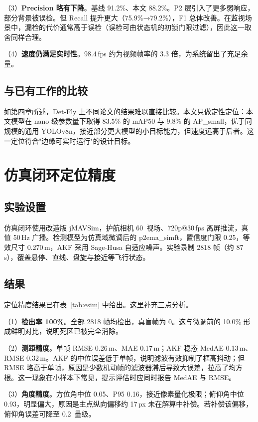 （3）\textbf{Precision 略有下降}。基线 91.2\%、本文 88.2\%。P2 层引入了更多弱响应，部分背景被误检。但 Recall 提升更大（75.9\%→79.2\%），F1 总体改善。在监视场景中，漏检的代价通常高于误检（误检可由状态机的初锁门限过滤），因此这一取舍同样合理。

（4）\textbf{速度仍满足实时性}。98.4\,fps 约为视频帧率的 3.3 倍，为系统留出了充足余量。

\subsection{与已有工作的比较}

如第四章所述，Det-Fly 上不同论文的结果难以直接比较。本文只做定性定位：本文模型在 nano 级参数量下取得 83.5\% 的 mAP50 与 9.8\% 的 AP\_small，优于同规模的通用 YOLOv8n，接近部分更大模型的小目标能力，但速度远高于后者。这一定位符合"边缘可实时运行"的设计目标。

\section{仿真闭环定位精度}

\subsection{实验设置}

仿真闭环使用改造版 jMAVSim，护航相机 60\textdegree\ 视场、720p@30\,fps 离屏推流，真值 50\,Hz 广播。检测模型为仿真域微调后的 p2ema\_simft，置信度门限 0.25，等效尺寸 0.270\,m，AKF 采用 Sage-Husa 自适应噪声。实验录制 2818 帧（约 87\,s），覆盖悬停、直线、盘旋与接近等飞行状态。

\subsection{结果}

定位精度结果已在表~\ref{tab:esim} 中给出。这里补充三点分析。

（1）\textbf{检出率 100\%}。全部 2818 帧均检出，真盲帧为 0。这与微调前的 10.0\% 形成鲜明对比，说明死区已被完全消除。

（2）\textbf{测距精度}。单帧 RMSE 0.26\,m、MAE 0.17\,m；AKF 稳态 MedAE 0.13\,m、RMSE 0.32\,m。AKF 的中位误差低于单帧，说明滤波有效抑制了框高抖动；但 RMSE 略高于单帧，原因是少数机动帧的滤波器滞后导致大误差，拉高了均方根。这一现象在小样本下常见，提示评估时应同时报告 MedAE 与 RMSE。

（3）\textbf{角度精度}。方位角中位 0.05\textdegree、P95 0.16\textdegree，接近像素量化极限；俯仰角中位 0.93\textdegree，明显偏大，原因是主点纵向偏移约 17\,px 未在解算中补偿。若补偿该偏移，俯仰角误差可降至 0.2\textdegree\ 量级。

